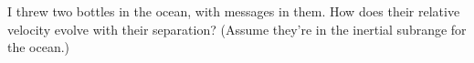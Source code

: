 
    I threw two bottles in the ocean, with messages in them.  
    How does their relative velocity evolve with their separation?
    (Assume they're in the inertial subrange for the ocean.) 

 
